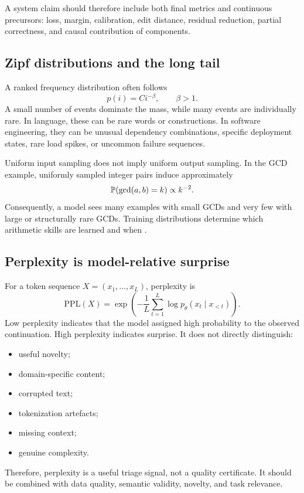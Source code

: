 A system claim should therefore include both final metrics and continuous precursors: loss, margin, calibration, edit distance, residual reduction, partial correctness, and causal contribution of components.

\subsection{Zipf distributions and the long tail}

A ranked frequency distribution often follows
\[
p(i) = C i^{-\beta}, \qquad \beta>1.
\]
A small number of events dominate the mass, while many events are individually rare. In language, these can be rare words or constructions. In software engineering, they can be unusual dependency combinations, specific deployment states, rare load spikes, or uncommon failure sequences.

Uniform input sampling does not imply uniform output sampling. In the GCD example, uniformly sampled integer pairs induce approximately
\[
\mathbb{P}(\gcd(a,b)=k) \propto k^{-2}.
\]
Consequently, a model sees many examples with small GCDs and very few with large or structurally rare GCDs. Training distributions determine which arithmetic skills are learned and when \citep{charton2024gcd}.

\subsection{Perplexity is model-relative surprise}

For a token sequence $X=(x_1,\ldots,x_L)$, perplexity is
\[
\mathrm{PPL}(X)
= \exp\left(
-\frac{1}{L}\sum_{t=1}^{L}
\log p_\theta(x_t\mid x_{<t})
\right).
\]
Low perplexity indicates that the model assigned high probability to the observed continuation. High perplexity indicates surprise. It does not directly distinguish:

\begin{itemize}[leftmargin=*]
  \item useful novelty;
  \item domain-specific content;
  \item corrupted text;
  \item tokenization artefacts;
  \item missing context;
  \item genuine complexity.
\end{itemize}

Therefore, perplexity is a useful triage signal, not a quality certificate. It should be combined with data quality, semantic validity, novelty, and task relevance.

